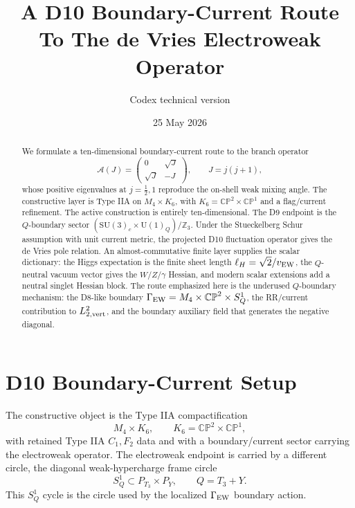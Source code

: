 \documentclass[11pt]{article}
\title{\bf A D10 Boundary-Current Route To The de Vries Electroweak Operator}
\author{Codex technical version}
\date{25 May 2026}
\theoremstyle{definition}
\theoremstyle{remark}
\newcommand{\SU}{\mathrm{SU}}
\newcommand{\U}{\mathrm{U}}
\newcommand{\CP}{\mathbb{CP}}
\newcommand{\Z}{\mathbb{Z}}
\newcommand{\half}{\tfrac12}
\newcommand{\cA}{\mathcal A}
\begin{document}
\maketitle


\begin{abstract}
\noindent
We formulate a ten-dimensional boundary-current route to the branch operator
\[
  \cA(J)=
  \begin{pmatrix}
  0&\sqrt J\\
  \sqrt J&-J
  \end{pmatrix},
  \qquad J=j(j+1),
\]
whose positive eigenvalues at \(j=\half,1\) reproduce the on-shell weak
mixing angle.  The constructive layer is Type IIA on
\(M_4\times K_6\), with \(K_6=\CP^2\times\CP^1\) and a flag/current
refinement.  The active construction is entirely ten-dimensional.  The D9
endpoint is the \(Q\)-boundary sector
\((\SU(3)_c\times\U(1)_Q)/\Z_3\).  Under the Stueckelberg Schur assumption
with unit current metric, the projected D10 fluctuation operator gives the de
Vries pole relation.  An almost-commutative finite layer supplies the scalar
dictionary: the Higgs expectation is the finite sheet length
\(\ell_H=\sqrt2/v_{\rm EW}\), the \(Q\)-neutral vacuum vector gives the
\(W/Z/\gamma\) Hessian, and modern scalar extensions add a neutral singlet
Hessian block.  The route emphasized here is the underused \(Q\)-boundary
mechanism: the D8-like boundary
\(\Gamma_{\rm EW}=M_4\times\CP^2\times S^1_Q\), the RR/current contribution
to \(L_{2,{\rm vert}}^2\), and the boundary auxiliary field that generates the
negative diagonal.
\end{abstract}

\tableofcontents

\section{D10 Boundary-Current Setup}

The constructive object is the Type IIA compactification
\[
  M_4\times K_6,
  \qquad
  K_6=\CP^2\times\CP^1,
\]
with retained Type IIA \(C_1,F_2\) data and with a boundary/current sector
carrying the electroweak operator.
The electroweak endpoint is carried by a different circle, the diagonal
weak-hypercharge frame circle
\[
  S^1_Q\subset P_{T_3}\times P_Y,
  \qquad Q=T_3+Y.
\]
This \(S^1_Q\) cycle is the circle used by the localized
\(\Gamma_{\rm EW}\) boundary action.
\end{document}
